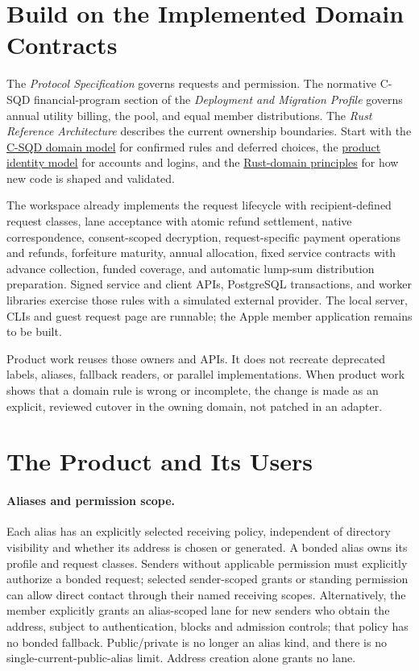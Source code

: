 \documentclass[11pt]{article}
\begin{document}
\section{Build on the Implemented Domain Contracts}

The \textit{Protocol Specification} governs requests and permission. The normative
C-SQD financial-program section of the \textit{Deployment and Migration Profile}
governs annual utility billing, the pool, and equal member distributions. The
\textit{Rust Reference Architecture} describes the current ownership boundaries.
Start with the \href{DOMAIN_MODEL.md}{C-SQD domain model} for confirmed rules and
deferred choices, the \href{docs/product-identity-model.md}{product identity
model} for accounts and logins, and the
\href{docs/rust-domain-principles.md}{Rust-domain principles} for how new code is
shaped and validated.

The workspace already implements the request lifecycle with recipient-defined
request classes, lane acceptance with atomic refund settlement, native
correspondence, consent-scoped decryption, request-specific payment operations
and refunds, forfeiture maturity, annual allocation, fixed service contracts with
advance collection, funded coverage, and automatic lump-sum distribution
preparation. Signed service and client APIs, PostgreSQL transactions, and worker
libraries exercise those rules with a simulated external provider. The local
server, CLIs and guest request page are runnable; the Apple member application
remains to be built.

Product work reuses those owners and APIs. It does not recreate deprecated labels,
aliases, fallback readers, or parallel implementations. When product work shows
that a domain rule is wrong or incomplete, the change is made as an explicit,
reviewed cutover in the owning domain, not patched in an adapter.

\section{The Product and Its Users}

\paragraph{Aliases and permission scope.}
Each alias has an explicitly selected receiving policy, independent of directory
visibility and whether its address is chosen or generated. A bonded alias owns its
profile and request classes. Senders without applicable permission must explicitly
authorize a bonded request; selected sender-scoped grants or standing permission
can allow direct contact through their named receiving scopes. Alternatively,
the member explicitly grants an alias-scoped lane for new senders who obtain the
address, subject to authentication, blocks and admission controls; that policy has
no bonded fallback. Public/private is no longer an alias kind, and there is no
single-current-public-alias limit. Address creation alone grants no lane.
\end{document}
